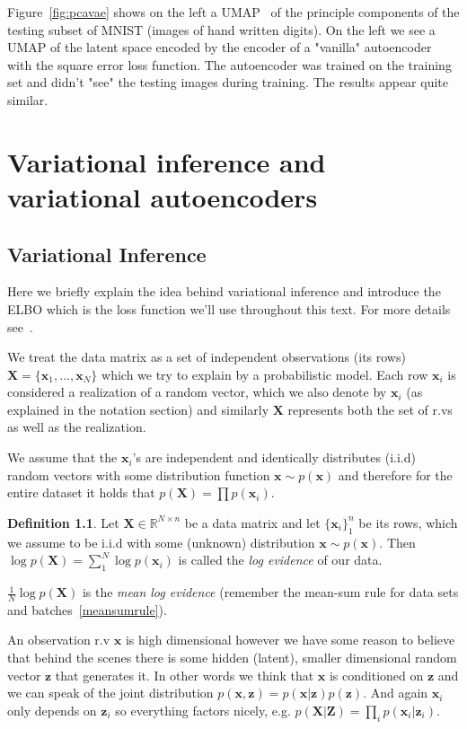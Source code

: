 \documentclass[11pt, a4paper]{report}
\theoremstyle{plain}
\theoremstyle{definition}
\newtheorem{mydef}{Definition}[chapter]
\theoremstyle{remark}
\newcommand{\R}{\mathbb{R}}
\newcommand{\X}{\mathbf{X}}
\newcommand{\x}{\mathbf{x}}
\newcommand{\Z}{\mathbf{Z}}
\newcommand{\z}{\mathbf{z}}
\newcommand{\bv}[1]{\boldsymbol{#1}}
\begin{document}
Figure~\ref{fig:pcavae} shows on the left a
UMAP~\cite{mcinnes2018umap} of the principle components of the testing subset of
MNIST (images of hand written digits). On the left we see a UMAP of the latent
space encoded by the encoder of a "vanilla" autoencoder with the square error loss
function. The autoencoder was
trained on the training set and didn't "see" the testing images during training.
The results appear quite similar.

\chapter{Variational inference and variational autoencoders}
\section{Variational Inference}

Here we briefly explain the idea behind variational inference and introduce the
ELBO which is the loss function we'll use throughout this text.
For more details see~\cite{bishop2006pattern}.

We treat the data matrix as a set of independent observations (its rows)
$\bv{X} = \{\bv{x}_1, \dots
, \bv{x}_N\}$ which we try to explain by a probabilistic model. 
Each row $\x_i$ is considered a realization of a random vector, which we also 
denote by $\x_i$ (as explained in the notation section) and similarly $\X$
represents both the set of r.vs as well as the realization.

We assume that
the $\bv{x}_i$'s are independent and identically distributes (i.i.d) random vectors
with some distribution function $\x \sim p(\x)$ and therefore for
the entire dataset it holds that $p(\bv{X}) = \prod p(\bv{x}_i)$.

\begin{mydef}
\label{def:logevidence}
Let $\bv{X} \in \R^{N \times n}$ be a data matrix and let $\{\bv{x}_i\}_1^n$ be its
rows,
which we assume to be i.i.d with some (unknown) distribution $\x \sim p(\bv{x})$.
Then $\log p(\bv{X}) = \sum_1^N \log p(\bv{x}_i)$ is called the \emph{log evidence} of our
data.

$\frac{1}{N}\log p(\X)$ is the \emph{mean log evidence} (remember the
mean-sum rule for data sets and
batches~\ref{meansumrule}).
\end{mydef}

An observation r.v $\bv{x}$ is high dimensional however
we have some reason to believe that behind the scenes there is some hidden
(latent), smaller dimensional random vector $\z$ that generates it.
In other words we think that $\x$ is conditioned on $\z$ and we can speak of
the joint distribution $p(\x,\z) = p(\x | \z)p(\z)$.
And again $\x_i$ only depends on $\z_i$ so everything factors nicely, e.g. 
$p(\X | \Z) = \prod_i p(\x_i | \z_i)$.
\end{document}
